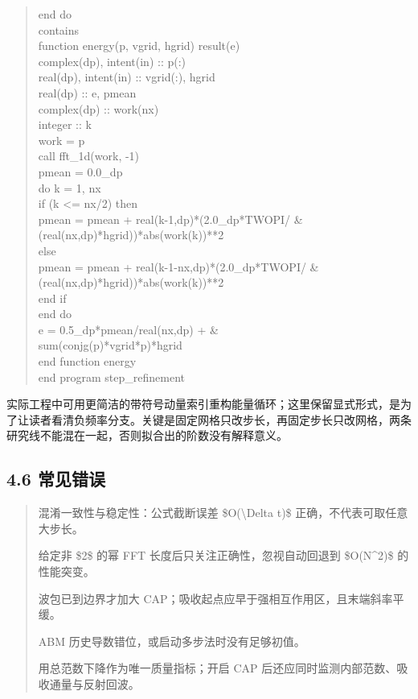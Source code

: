 \documentclass[UTF8,openany,11pt,fontset=fandol]{ctexbook}
\begin{document}
\begin{quote}
end do\\
contains\\
function energy(p, vgrid, hgrid) result(e)\\
complex(dp), intent(in) :: p(:)\\
real(dp), intent(in) :: vgrid(:), hgrid\\
real(dp) :: e, pmean\\
complex(dp) :: work(nx)\\
integer :: k\\
work = p\\
call fft\_1d(work, -1)\\
pmean = 0.0\_dp\\
do k = 1, nx\\
if (k \textless= nx/2) then\\
pmean = pmean + real(k-1,dp)*(2.0\_dp*TWOPI/ \&\\
(real(nx,dp)*hgrid))*abs(work(k))**2\\
else\\
pmean = pmean + real(k-1-nx,dp)*(2.0\_dp*TWOPI/ \&\\
(real(nx,dp)*hgrid))*abs(work(k))**2\\
end if\\
end do\\
e = 0.5\_dp*pmean/real(nx,dp) + \&\\
sum(conjg(p)*vgrid*p)*hgrid\\
end function energy\\
end program step\_refinement
\end{quote}

实际工程中可用更简洁的带符号动量索引重构能量循环；这里保留显式形式，是为了让读者看清负频率分支。关键是固定网格只改步长，再固定步长只改网格，两条研究线不能混在一起，否则拟合出的阶数没有解释意义。

\subsection{\texorpdfstring{\textbf{4.6
常见错误}}{4.6 常见错误}}\label{ux5e38ux89c1ux9519ux8bef-3}

\begin{quote}
混淆一致性与稳定性：公式截断误差 \$O(\textbackslash Delta t)\$
正确，不代表可取任意大步长。

给定非 \$2\$ 的幂 FFT 长度后只关注正确性，忽视自动回退到 \$O(N\^{}2)\$
的性能突变。

波包已到边界才加大 CAP；吸收起点应早于强相互作用区，且末端斜率平缓。

ABM 历史导数错位，或启动多步法时没有足够初值。

用总范数下降作为唯一质量指标；开启 CAP
后还应同时监测内部范数、吸收通量与反射回波。
\end{quote}
\end{document}
